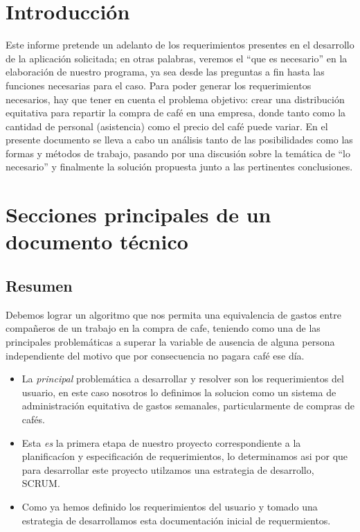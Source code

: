 \documentclass[twocolumn,11pts]{IEEEtran}
\begin{document}
\section{Introducción}

Este informe pretende un adelanto de los requerimientos presentes en el desarrollo de la aplicación solicitada; en otras palabras, veremos el “que es necesario” en la elaboración de nuestro programa, ya sea desde las preguntas a fin hasta las funciones necesarias para el caso.
Para poder generar los requerimientos necesarios, hay que tener en cuenta el problema objetivo: crear una distribución equitativa para repartir la compra de café en una empresa, donde tanto como la cantidad de personal (asistencia) como el precio del café puede variar.
En el presente documento se lleva a cabo un análisis tanto de las posibilidades como las formas y métodos de trabajo, pasando por una discusión sobre la temática de “lo necesario” y finalmente la solución propuesta junto a las pertinentes conclusiones.

\section{Secciones principales de un documento técnico}

\subsection{Resumen}
Debemos lograr un algoritmo que nos permita una equivalencia de gastos entre compañeros de un trabajo en la compra de cafe, teniendo como una de las principales problemáticas a superar la variable de ausencia de alguna persona independiente del motivo que por consecuencia no pagara café ese día.
\begin{itemize}
\item La \emph{principal} problemática a desarrollar y resolver son los requerimientos del usuario, en este caso nosotros lo definimos la solucion como un sistema de administración equitativa de gastos semanales, particularmente de compras de cafés.
\item Esta \emph{es} la primera etapa de nuestro proyecto correspondiente a la planificacíon y especificación de requerimientos, lo determinamos asi por que para desarrollar este proyecto utilzamos una estrategia de desarrollo, SCRUM.
\item Como ya hemos definido los requerimientos del usuario y tomado una estrategia de desarrollamos esta documentación inicial de requermientos.
\end{itemize}
\end{document}
